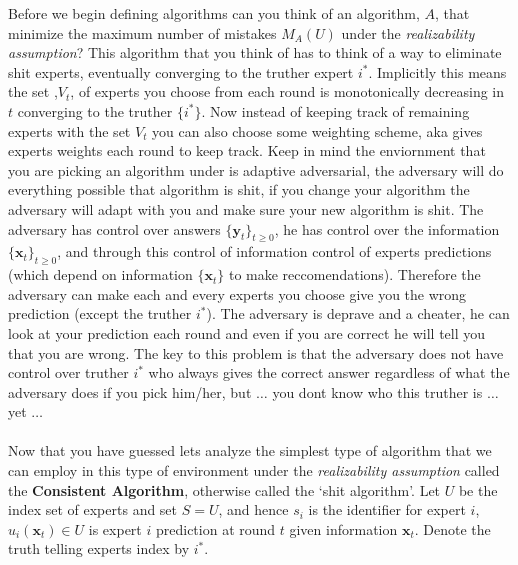 \documentclass[11pt]{article}
\theoremstyle{quest}
\begin{document}
Before we begin defining  algorithms  can you think of an algorithm, $A$, that minimize the maximum number of mistakes $M_{A}(U)$ under the  \textit{realizability assumption}? This algorithm that you think of has to think of a way to eliminate shit experts, eventually converging to the truther expert $i^*$. Implicitly this means the set ,$V_t$, of experts you choose from each round is monotonically decreasing in $t$ converging to the truther $\{ i^*\}$. Now instead of keeping track of remaining experts with the set $V_t$ you can also choose some weighting scheme, aka gives experts weights each round to keep track. Keep in mind the enviornment that you are picking an algorithm under is adaptive adversarial,  the adversary will do everything possible that algorithm is shit, if you change your algorithm the adversary will adapt with you and make sure your new algorithm is shit. The adversary has control over answers $\{\mathbf{y}_t\}_{t\ge0}$, he has control over the information $\{\mathbf{x}_t\}_{t\ge0}$, and through this control of information control of experts predictions (which depend on information $\{\mathbf{x}_t\}$ to make reccomendations). Therefore the adversary can make each and every experts you choose give you the wrong prediction (except the truther $i^*$). The adversary is deprave and a cheater, he can look at your prediction each round and even if you are correct he will tell you that you are wrong. The key to this problem is that the adversary does not have control over truther $i^*$ who always gives the correct answer regardless of what the adversary does if you pick him/her, but $\dots$ you dont know who this truther is $\dots$ yet $\dots$\\ \\
%
Now that you have guessed lets analyze the simplest type of algorithm that we can employ in this type of environment under the  \textit{realizability assumption} called the \textbf{Consistent Algorithm}, otherwise called the `shit algorithm'. Let $U$ be the index set of experts and set $S = U$, and hence $s_i$ is the identifier for expert $i$, $u_i(\mathbf{x}_t)\in U$ is expert $i$ prediction at round $t$ given information $\mathbf{x}_t$.  Denote the truth telling experts index by $i^*$.\\ \\
\end{document}
